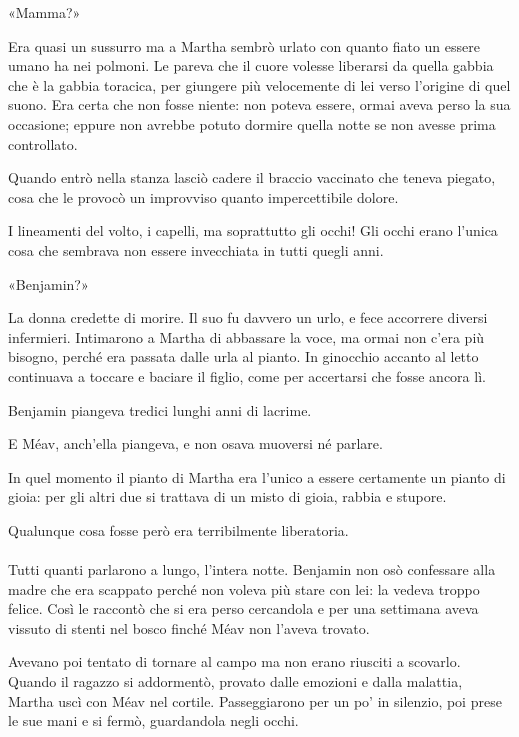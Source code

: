 \documentclass[a4paper,12pt]{book}
\begin{document}
«Mamma?»

Era quasi un sussurro ma a Martha sembrò urlato con quanto fiato un essere
umano ha nei polmoni. Le pareva che il cuore volesse liberarsi da quella gabbia
che è la gabbia toracica, per giungere più velocemente di lei verso
l’origine di quel suono. Era certa che non fosse niente: non poteva essere,
ormai aveva perso la sua occasione; eppure non avrebbe potuto dormire quella
notte se non avesse prima controllato.

Quando entrò nella stanza lasciò cadere il braccio vaccinato che teneva
piegato, cosa che le provocò un improvviso quanto impercettibile dolore.

I lineamenti del volto, i capelli, ma soprattutto gli occhi! Gli occhi erano
l’unica cosa che sembrava non essere invecchiata in tutti quegli anni.

«Benjamin?»

La donna credette di morire. Il suo fu davvero un urlo, e fece accorrere diversi
infermieri. Intimarono a Martha di abbassare la voce, ma ormai non c’era più
bisogno, perché era passata dalle urla al pianto. In ginocchio accanto al letto
continuava a toccare e baciare il figlio, come per accertarsi che fosse ancora
lì.

Benjamin piangeva tredici lunghi anni di lacrime.

E Méav, anch’ella piangeva, e non osava muoversi né parlare.

In quel momento il pianto di Martha era l’unico a essere certamente un pianto
di gioia: per gli altri due si trattava di un misto di gioia, rabbia e stupore.

Qualunque cosa fosse però era terribilmente liberatoria.

\paragraph{}
Tutti quanti parlarono a lungo, l’intera notte. Benjamin non osò confessare
alla madre che era scappato perché non voleva più stare con lei: la vedeva
troppo felice. Così le raccontò che si era perso cercandola e per una
settimana aveva vissuto di stenti nel bosco finché Méav non l’aveva trovato.

Avevano poi tentato di tornare al campo ma non erano riusciti a scovarlo. Quando
il ragazzo si addormentò, provato dalle emozioni e dalla malattia, Martha uscì
con Méav nel cortile. Passeggiarono per un po’ in silenzio, poi prese le sue
mani e si fermò, guardandola negli occhi.
\end{document}
